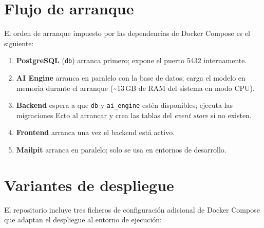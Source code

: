 \section{Flujo de arranque}

El orden de arranque impuesto por las dependencias de Docker Compose es el siguiente:

\begin{enumerate}
    \item \textbf{PostgreSQL} (\texttt{db}) arranca primero; expone el puerto 5432 internamente.
    \item \textbf{AI Engine} arranca en paralelo con la base de datos; carga el modelo en memoria durante el arranque (\textasciitilde{}13\,GB de RAM del sistema en modo CPU).
    \item \textbf{Backend} espera a que \texttt{db} y \texttt{ai\_engine} estén disponibles; ejecuta las migraciones Ecto al arrancar y crea las tablas del \emph{event store} si no existen.
    \item \textbf{Frontend} arranca una vez el backend está activo.
    \item \textbf{Mailpit} arranca en paralelo; solo se usa en entornos de desarrollo.
\end{enumerate}

\section{Variantes de despliegue}

El repositorio incluye tres ficheros de configuración adicional de Docker Compose que adaptan el despliegue al entorno de ejecución:

